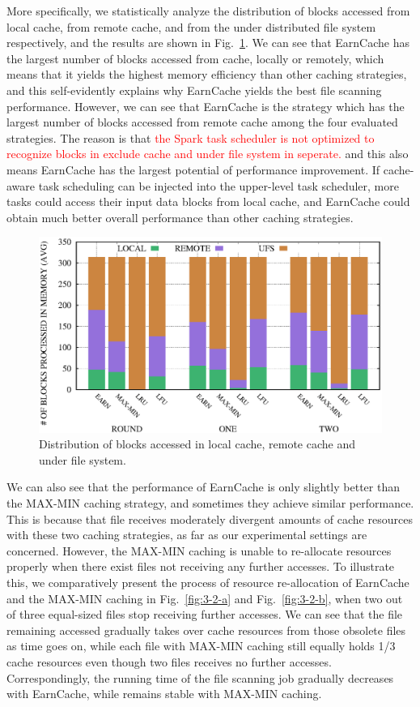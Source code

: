 More specifically, we statistically analyze the distribution of blocks accessed from local cache, from remote cache, and from the under distributed file system respectively, and the results are shown in Fig.~\ref{fig:block_count}. We can see that EarnCache has the largest number of blocks accessed from cache, locally or remotely, which means that it yields the highest memory efficiency than other caching strategies, and this self-evidently explains why EarnCache yields the best file scanning performance. However, we can see that EarnCache is the strategy which has the largest number of blocks accessed from remote cache among the four evaluated strategies. The reason is that \textcolor{red}{the Spark task scheduler is not optimized to recognize blocks in exclude cache and under file system in seperate.}
and this also means EarnCache has the largest potential of performance improvement. If cache-aware task scheduling can be injected into the upper-level task scheduler, more tasks could access their input data blocks from local cache, and EarnCache could obtain much better overall performance than other caching strategies.

\begin{figure}[!htbp]
    \centering
    \includegraphics[scale=0.43]{figures/block_count_avg.eps}
    \caption{Distribution of blocks accessed in local cache, remote cache and under file system.}
    \label{fig:block_count}
\end{figure}

We can also see that the performance of EarnCache is only slightly better than the MAX-MIN caching strategy, and sometimes they achieve similar performance. This is because that file receives moderately divergent amounts of cache resources with these two caching strategies, as far as our experimental settings are concerned. However, the MAX-MIN caching is unable to re-allocate resources properly when there exist files not receiving any further accesses. To illustrate this, we comparatively present the process of resource re-allocation of EarnCache and the MAX-MIN caching in Fig.~\ref{fig:3-2-a} and Fig.~\ref{fig:3-2-b}, when two out of three equal-sized files stop receiving further accesses. We can see that the file remaining accessed gradually takes over cache resources from those obsolete files as time goes on, while each file with MAX-MIN caching still equally holds 1/3 cache resources even though two files receives no further accesses. Correspondingly, the running time of the file scanning job gradually decreases with EarnCache, while remains stable with MAX-MIN caching.  

